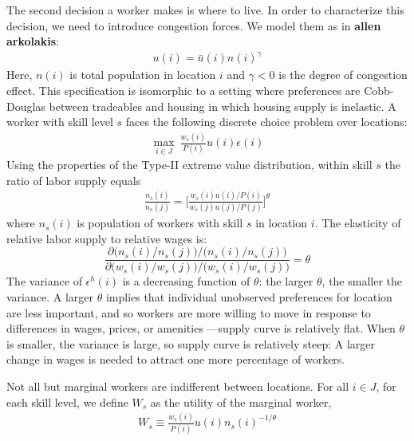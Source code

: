 \documentclass{article}
\begin{document}
The second decision a worker makes is where to live.  In order to characterize this decision, we need to introduce congestion forces.  We model them as in \textbf{allen arkolakis}:
\begin{eqnarray}\label{eq:congestion}
u(i) = \bar{u}(i)  n(i)^{\gamma}
\end{eqnarray}
Here, $n(i)$ is total population in location $i$ and $\gamma<0$ is the degree of congestion effect. This specification is isomorphic to a setting where preferences are Cobb-Douglas between tradeables and housing in which housing supply is inelastic.
A worker with skill level $s$ faces the following discrete choice problem over locations:
\begin{eqnarray} 
\max_{i \in J}~ \frac{w_s(i)}{P(i)}u(i) \epsilon(i)  \nonumber
\end{eqnarray}
Using the properties of the Type-II extreme value distribution, within skill $s$ the ratio of labor supply equals
\begin{eqnarray}
	\frac{n_s(i)}{n_s(j)} = 
	\Big[
	\frac{w_s(i)u(i)/P(i)}
	{w_s(j)u(j) /P(j)}
	\Big]^{\theta} \nonumber  
\end{eqnarray} 
where $n_s(i)$ is population of workers with skill $s$ in location $i$.
The elasticity of relative labor supply to relative wages is:
\[
\frac{ \partial \Big(n_s(i)/n_s(j)\Big) \Big/
\Big(n_s(i)/n_s(j)\Big)}
{\partial \Big(w_s(i)/w_s(j)\Big) \Big/
\Big(w_s(i)/w_s(j)\Big) } = \theta
\]
The variance of $\epsilon^h(i)$ is a decreasing function of $\theta$: the larger $\theta$, the smaller the variance. A larger $\theta$ implies that individual unobserved preferences for location are less important, and so workers are more willing to move in response to differences in wages, prices, or amenities ---supply curve is relatively flat.
When $\theta$ is smaller, the variance is large, so supply curve is relatively steep: A larger change in wages is needed to attract one more percentage of workers. 

Not all but marginal workers are indifferent between locations. For all $i \in J$, for each skill level, we define $W_s$ as the utility of the marginal worker,
\begin{eqnarray}\label{eq:indiff}
	 W_s \equiv \frac{w_s(i)} {P(i)} u(i) n_s(i)^{-1/\theta}
\end{eqnarray}
\end{document}
